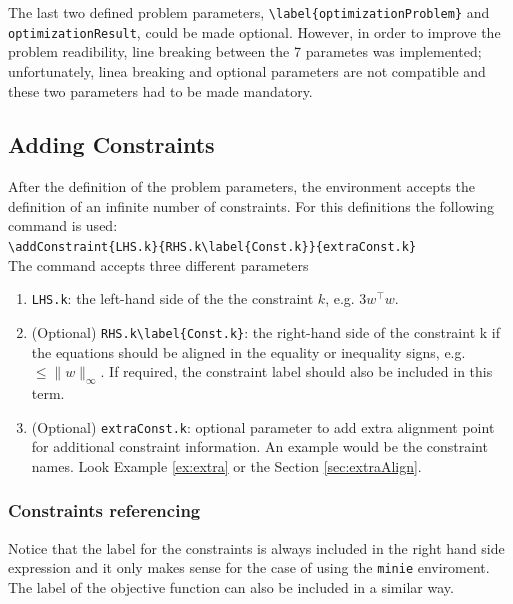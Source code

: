 \documentclass[a4paper]{article}
\begin{document}
The last two defined problem parameters,  \verb|\label{optimizationProblem}| and \verb|optimizationResult|, could be made optional. However, in order to improve the problem readibility, line breaking between the 7 parametes was implemented; unfortunately, linea breaking and optional parameters are not compatible and these two parameters had to be made mandatory.

\subsection{Adding Constraints}
\label{subsec:syntax}
After the definition of the problem parameters, the environment accepts the definition of an infinite number of constraints. For this definitions the following command is used:
~\\

\verb|\addConstraint{LHS.k}{RHS.k\label{Const.k}}{extraConst.k}| 
~\\

The command accepts three different parameters
\begin{enumerate}
	\item \verb|LHS.k|: the left-hand side of the the constraint $k$, e.g. $3w^\top w$.
	\item (Optional) \verb|RHS.k\label{Const.k}|: the right-hand side of the constraint k if the equations should be aligned in the equality or inequality signs, e.g. $\leq \|w\|_\infty$. If required, the constraint label should also be included in this term. 
	\item (Optional) \verb|extraConst.k|: optional parameter to add extra alignment point for additional constraint information. An example would be the constraint names. Look Example \ref{ex:extra} or the Section \ref{sec:extraAlign}.
\end{enumerate}

\subsubsection{Constraints referencing}
Notice that the label for the constraints is always included in the right hand side expression and it only makes sense for the case of using the \verb|minie| enviroment. The label of the objective function can also be included in a similar way.
\end{document}
